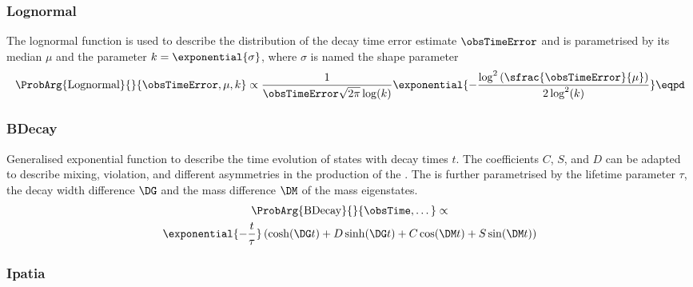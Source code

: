 \subsubsection{Lognormal}
\label{sec:measurement_of_sin2beta:likelihood_fit:pdfs:lognormal}

The lognormal function is \eg used to describe the distribution of the decay
time error estimate $\obsTimeError$ and is parametrised by its median $\mu$ and
the parameter $k = \exponential{\sigma}$, where $\sigma$ is named the shape
parameter
%
\begin{equation}\label{eq:measurement_of_sin2beta:likelihood_fit:pdfs:lognormal}
  \ProbArg{\text{Lognormal}}{}{\obsTimeError, \mu, k} \propto \frac{1}{\obsTimeError \sqrt{2\pi} \log (k)} \exponential{-\frac{\log^2 \left(\sfrac{\obsTimeError}{\mu}\right)}{2 \log^2(k)}}\eqpd
\end{equation}

\subsubsection{BDecay}
\label{sec:measurement_of_sin2beta:likelihood_fit:pdfs:bdecay}

Generalised exponential function to describe the time evolution of \Bmeson
states with decay times $t$. The coefficients $C$, $S$, and $D$ can be
adapted to describe \Bmeson mixing, \CP violation, and different asymmetries \eg
in the production of the \Bmesons. The \PDF is further parametrised by the
lifetime parameter $\tau$, the decay width difference $\DG$ and the mass
difference $\DM$ of the \Bmeson mass eigenstates.
%
\begin{multline}\label{eq:measurement_of_sin2beta:likelihood_fit:pdfs:bdecay}
  \ProbArg{\text{BDecay}}{}{\obsTime, \dots} \propto \\ \exponential{- \frac{t}{\tau}}\left( \cosh (\DG t) + D \sinh (\DG t) + C \cos (\DM t) + S \sin (\DM t) \right)
\end{multline}

\subsubsection{Ipatia}
\label{sec:measurement_of_sin2beta:likelihood_fit:pdfs:ipatia}


